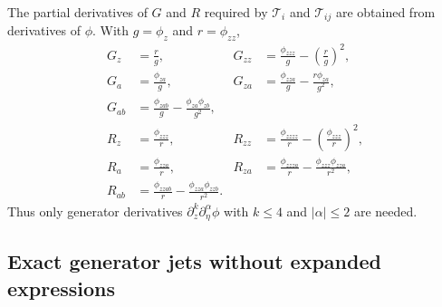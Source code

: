 \documentclass[10pt]{article}
\newcommand{\T}{\mathcal{T}}
\begin{document}
The partial derivatives of $G$ and $R$ required by $\T_i$ and $\T_{ij}$ are
obtained from derivatives of $\phi$.  With $g=\phi_z$ and $r=\phi_{zz}$,
\begin{align*}
G_z&=\frac{r}{g},
&G_{zz}&=\frac{\phi_{zzz}}{g}-\left(\frac{r}{g}\right)^2,\\
G_a&=\frac{\phi_{za}}{g},
&G_{za}&=\frac{\phi_{zza}}{g}-\frac{r\phi_{za}}{g^2},\\
G_{ab}&=\frac{\phi_{zab}}{g}-\frac{\phi_{za}\phi_{zb}}{g^2},\\[0.2em]
R_z&=\frac{\phi_{zzz}}{r},
&R_{zz}&=\frac{\phi_{zzzz}}{r}-\left(\frac{\phi_{zzz}}{r}\right)^2,\\
R_a&=\frac{\phi_{zza}}{r},
&R_{za}&=\frac{\phi_{zzza}}{r}-\frac{\phi_{zzz}\phi_{zza}}{r^2},\\
R_{ab}&=\frac{\phi_{zzab}}{r}-\frac{\phi_{zza}\phi_{zzb}}{r^2}.
\end{align*}
Thus only generator derivatives $\partial_z^k\partial_\eta^\alpha\phi$ with
$k\le4$ and $|\alpha|\le2$ are needed.

\subsection{Exact generator jets without expanded expressions}
\end{document}
